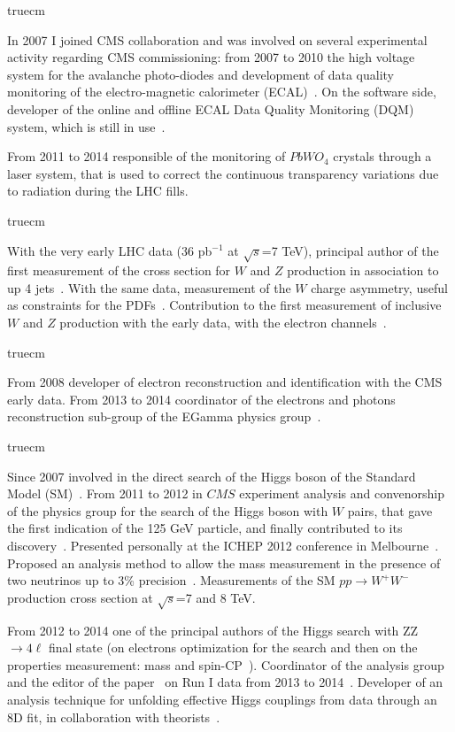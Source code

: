 \documentclass[11pt,twoside,a4paper]{article}
\begin{document}
 truecm

In 2007 I joined CMS collaboration and was involved on several
experimental activity regarding CMS commissioning: from 2007 to 2010
the high voltage system for the avalanche photo-diodes and development
of data quality monitoring of the electro-magnetic calorimeter
(ECAL)~\cite{ecal_craft}. On the software side, developer of the
online and offline ECAL Data Quality Monitoring (DQM) system, which is
still in use~\cite{proc_siena}.

From 2011 to 2014 responsible of the monitoring of
$PbWO_4$ crystals through a laser system, that is used to correct the
continuous transparency variations due to radiation during the LHC
fills.

 truecm

With the very early LHC data (36 pb$^{-1}$ at $\sqrt{s}$=7 TeV),
principal author of the first measurement of the cross section for $W$
and $Z$ production in association to up 4
jets~\cite{cms_vecbos_paper,proc_ifae,conf_ifae09,conf_lishep}.  With
the same data, measurement of the $W$ charge asymmetry, useful as
constraints for the PDFs~\cite{Chatrchyan:2011jz}.  Contribution to
the first measurement of inclusive $W$ and $Z$ production with the
early data, with the electron
channels~\cite{inclusiveV_2010,Khachatryan:2010xn,conf_plhc,proc_plhc}.

 truecm 

From 2008 developer of electron reconstruction and identification with
the CMS early data. From 2013 to 2014 coordinator of the electrons
and photons reconstruction sub-group of the EGamma physics
group~\cite{elepaper}.

 truecm

Since 2007 involved in the direct search of the Higgs boson of the
Standard Model
(SM)~\cite{cms_hww_paper2010,Chatrchyan:2012ty,Chatrchyan:2012tx,conf_hh}.
From 2011 to 2012 in $CMS$ experiment analysis and convenorship of the
physics group for the search of the Higgs boson with $W$ pairs, that
gave the first indication of the 125 GeV particle, and finally
contributed to its discovery~\cite{higgsdiscovery}. Presented
personally at the ICHEP 2012 conference in
Melbourne~\cite{conf_ichep12,proc_ichep12}. Proposed an analysis
method to allow the mass measurement in the presence of two neutrinos
up to 3\% precision~\cite{Chatrchyan:2013iaa}.
Measurements of the SM $pp\to W^+W^-$
production cross section at $\sqrt{s}$=7 and 8 TeV.

From 2012 to 2014 one of the principal authors of the Higgs search
with ZZ$\to4\ell$ final state (on electrons optimization for the
search and then on the properties measurement: mass and
spin-CP~\cite{conf_ichep14}). Coordinator of the analysis group and
the editor of the paper~\cite{h4l_legacy} on Run I data from 2013 to
2014~\cite{h4l_jcp,h4l_differential}. Developer of an analysis technique
for unfolding effective Higgs couplings from data through an 8D fit,
in collaboration with theorists~\cite{h4l_8d}.
\end{document}

